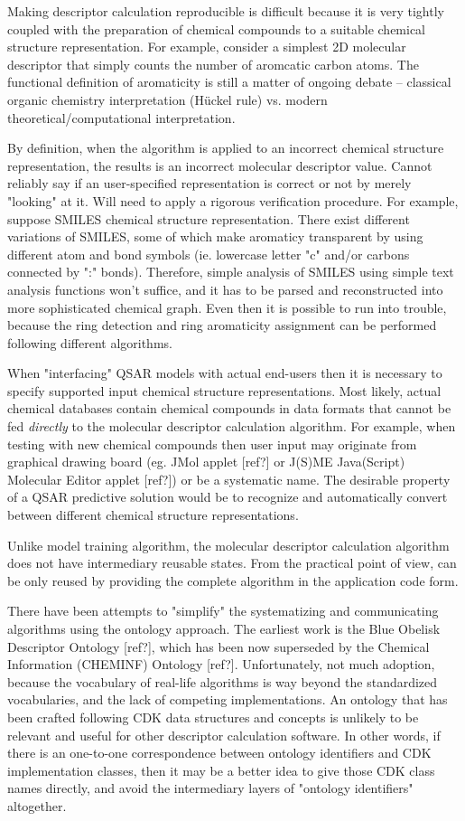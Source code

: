 \documentclass[12pt,letterpaper]{article}
\begin{document}
Making descriptor calculation reproducible is difficult because it is
very tightly coupled with the preparation of chemical compounds to a suitable
chemical structure representation. For example, consider a simplest 2D
molecular descriptor that simply counts the number of aromcatic carbon
atoms. The functional definition of aromaticity is still a matter of 
ongoing debate -- classical organic chemistry interpretation (Hückel rule) 
vs. modern theoretical/computational interpretation.

By definition, when the algorithm is applied to an incorrect chemical
structure representation, the results is an incorrect molecular descriptor
value. Cannot reliably say if an user-specified representation is correct
or not by merely "looking" at it. Will need to apply a rigorous verification
procedure. For example, suppose SMILES chemical structure representation.
There exist different variations of SMILES, some of which make aromaticy
transparent by using different atom and bond symbols (ie. lowercase letter "c" 
and/or carbons connected by ":" bonds). Therefore, simple analysis of SMILES
using simple text analysis functions won't suffice, and it has to be parsed 
and reconstructed into more sophisticated chemical graph. Even then it is
possible to run into trouble, because the ring detection and ring aromaticity
assignment can be performed following different algorithms.

When "interfacing" QSAR models with actual end-users then it is necessary
to specify supported input chemical structure representations. Most likely,
actual chemical databases contain chemical compounds in data formats that
cannot be fed \emph{directly} to the molecular descriptor calculation
algorithm. For example, when testing with new chemical compounds then user
input may originate from graphical drawing board (eg. JMol applet [ref?] or 
J(S)ME Java(Script) Molecular Editor applet [ref?]) or be a systematic
name. The desirable property of a QSAR predictive solution would be to
recognize and automatically convert between different chemical structure
representations.

Unlike model training algorithm, the molecular descriptor calculation
algorithm does not have intermediary reusable states. From the practical
point of view, can be only reused by providing the complete algorithm in 
the application code form.

There have been attempts to "simplify" the systematizing and communicating 
algorithms using the ontology approach. The earliest work is the Blue Obelisk
Descriptor Ontology [ref?], which has been now superseded by the Chemical 
Information (CHEMINF) Ontology [ref?]. Unfortunately, not much adoption, 
because the vocabulary of real-life algorithms is way beyond the standardized
vocabularies, and the lack of competing implementations. An ontology that
has been crafted following CDK data structures and concepts is unlikely to
be relevant and useful for other descriptor calculation software. In other
words, if there is an one-to-one correspondence between ontology identifiers
and CDK implementation classes, then it may be a better idea to give those
CDK class names directly, and avoid the intermediary layers of "ontology 
identifiers" altogether.
\end{document}
